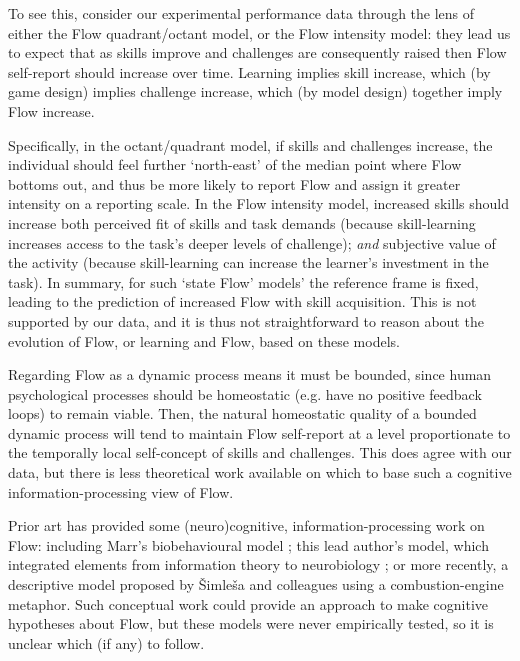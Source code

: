 \documentclass[fleqn,10pt]{wlscirep}
\begin{document}
To see this, consider our experimental performance data through the lens of either the Flow quadrant/octant model, or the Flow intensity model: they lead us to expect that as skills improve and challenges are consequently raised then Flow self-report should increase over time. Learning implies skill increase, which (by game design) implies challenge increase, which (by model design) together imply Flow increase.

Specifically, in the octant/quadrant model, if skills and challenges increase, the individual should feel further `north-east' of the median point where Flow bottoms out, and thus be more likely to report Flow and assign it greater intensity on a reporting scale. In the Flow intensity model, increased skills should increase both perceived fit of skills and task demands (because skill-learning increases access to the task's deeper levels of challenge); {\it and} subjective value of the activity (because skill-learning can increase the learner's investment in the task). In summary, for such `state Flow' models' the reference frame is fixed, leading to the prediction of increased Flow with skill acquisition. This is not supported by our data, and it is thus not straightforward to reason about the evolution of Flow, or learning and Flow, based on these models.

Regarding Flow as a dynamic process means it must be bounded, since human psychological processes should be homeostatic (e.g. have no positive feedback loops) to remain viable. Then, the natural homeostatic quality of a bounded dynamic process will tend to maintain Flow self-report at a level proportionate to the temporally local self-concept of skills and challenges. This does agree with our data, but there is less theoretical work available on which to base such a cognitive information-processing view of Flow.

Prior art has provided some (neuro)cognitive, information-processing work on Flow: including Marr's biobehavioural model \cite{Marr2001}; this lead author's model, which integrated elements from information theory to neurobiology \cite{Cowley2008}; or more recently, a descriptive model proposed by {\v{S}}imle{\v{s}}a and colleagues \cite{Simlesa2018} using a combustion-engine metaphor. Such conceptual work could provide an approach to make cognitive hypotheses about Flow, but these models were never empirically tested, so it is unclear which (if any) to follow.
\end{document}
